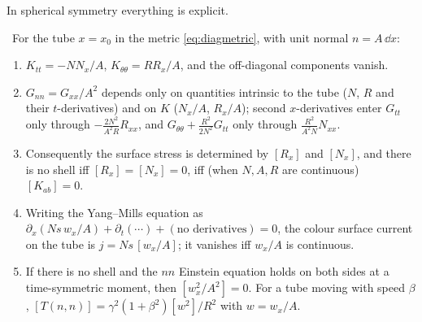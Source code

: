 In spherical symmetry everything is explicit.

\begin{theorem}\label{thm:tube}\ver\
For the tube $x=x_0$ in the metric \eqref{eq:diagmetric}, with unit normal $n=A\,\dd x$:
\begin{enumerate}[label=(\roman*)]
\item $K_{tt}=-NN_x/A$, $K_{\theta\theta}=RR_x/A$, and the off-diagonal components vanish.
\item $G_{nn}=G_{xx}/A^2$ depends only on quantities intrinsic to the tube ($N$, $R$ and their $t$-derivatives) and on $K$ ($N_x/A$, $R_x/A$); second $x$-derivatives enter $G_{tt}$ only through $-\frac{2N^2}{A^2R}R_{xx}$, and $G_{\theta\theta}+\frac{R^2}{2N^2}G_{tt}$ only through $\frac{R^2}{A^2N}N_{xx}$.
\item Consequently the surface stress is determined by $[R_x]$ and $[N_x]$, and there is no shell iff $[R_x]=[N_x]=0$, iff (when $N,A,R$ are continuous) $[K_{ab}]=0$.
\item Writing the Yang--Mills equation as $\partial_x(Ns\,w_x/A)+\partial_t(\cdots)+(\text{no derivatives})=0$, the colour surface current on the tube is $j=Ns\,[w_x/A]$; it vanishes iff $w_x/A$ is continuous.
\item If there is no shell and the $nn$ Einstein equation holds on both sides at a time-symmetric moment, then $[w_x^2/A^2]=0$. For a tube moving with speed $\beta$, $[T(n,n)]=\gamma^2(1+\beta^2)[w^2]/R^2$ with $w=w_x/A$.
\end{enumerate}
\end{theorem}

